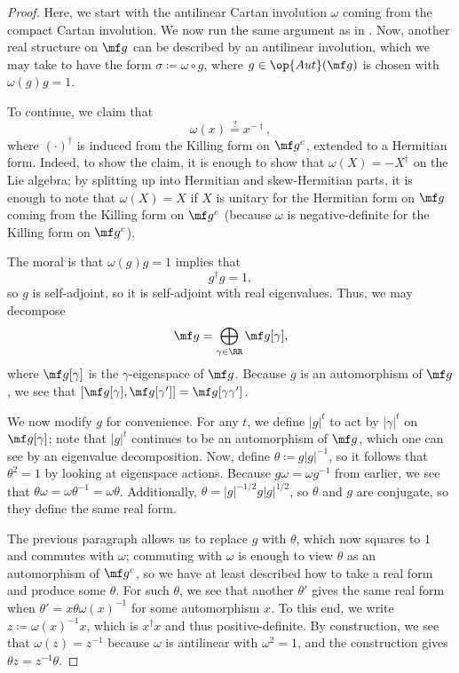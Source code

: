 \documentclass[../notes.tex]{subfiles}
\begin{document}
\begin{proof}
	Here, we start with the antilinear Cartan involution $\omega$ coming from the compact Cartan involution. We now run the same argument as in . Now, another real structure on $\mf g$ can be described by an antilinear involution, which we may take to have the form $\sigma\coloneqq\omega\circ g$, where $g\in\op{Aut}(\mf g)$ is chosen with $\omega(g)g=1$.

	To continue, we claim that
	\[\omega(x)\stackrel?=x^{-\dagger},\]
	where $(\cdot)^\dagger$ is induced from the Killing form on $\mf g^c$, extended to a Hermitian form. Indeed, to show the claim, it is enough to show that $\omega(X)=-X^\dagger$ on the Lie algebra; by splitting up into Hermitian and skew-Hermitian parts, it is enough to note that $\omega(X)=X$ if $X$ is unitary for the Hermitian form on $\mf g$ coming from the Killing form on $\mf g^c$ (because $\omega$ is negative-definite for the Killing form on $\mf g^c$).

	The moral is that $\omega(g)g=1$ implies that
	\[g^\dagger g=1,\]
	so $g$ is self-adjoint, so it is self-adjoint with real eigenvalues. Thus, we may decompose
	\[\mf g=\bigoplus_{\gamma\in\RR}\mf g[\gamma],\]
	where $\mf g[\gamma]$ is the $\gamma$-eigenspace of $\mf g$. Because $g$ is an automorphism of $\mf g$, we see that $[\mf g[\gamma],\mf g[\gamma']]=\mf g[\gamma\gamma']$.

	We now modify $g$ for convenience. For any $t$, we define $\left|g\right|^t$ to act by $\left|\gamma\right|^t$ on $\mf g[\gamma]$; note that $\left|g\right|^t$ continues to be an automorphism of $\mf g$, which one can see by an eigenvalue decomposition. Now, define $\theta\coloneqq g\left|g\right|^{-1}$, so it follows that $\theta^2=1$ by looking at eigenspace actions. Because $g\omega=\omega g^{-1}$ from earlier, we see that $\theta\omega=\omega\theta^{-1}=\omega\theta$. Additionally, $\theta=\left|g\right|^{-1/2}g\left|g\right|^{1/2}$, so $\theta$ and $g$ are conjugate, so they define the same real form.

	The previous paragraph allows us to replace $g$ with $\theta$, which now squares to $1$ and commutes with $\omega$; commuting with $\omega$ is enough to view $\theta$ as an automorphism of $\mf g^c$, so we have at least described how to take a real form and produce some $\theta$. For such $\theta$, we see that another $\theta'$ gives the same real form when $\theta'=x\theta\omega(x)^{-1}$ for some automorphism $x$. To this end, we write $z\coloneqq\omega(x)^{-1}x$, which is $x^\dagger x$ and thus positive-definite. By construction, we see that $\omega(z)=z^{-1}$ because $\omega$ is antilinear with $\omega^2=1$, and the construction gives $\theta z=z^{-1}\theta$.


\end{proof}
\end{document}
